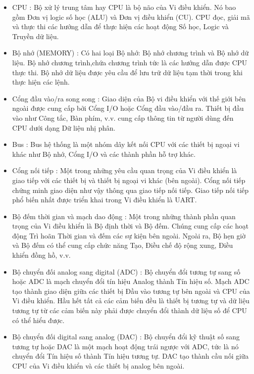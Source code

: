\documentclass{article} %
\begin{document}
	\begin{itemize}
		\item CPU : Bộ xử lý trung tâm hay CPU là bộ não của Vi điều khiển. Nó bao gồm Đơn vị logic số học (ALU) và Đơn vị điều khiển (CU). CPU đọc, giải mã và thực thi các hướng dẫn để thực hiện các hoạt động Số học, Logic và Truyền dữ liệu.
		\item Bộ nhớ (MEMORY) : Có hai loại Bộ nhớ: Bộ nhớ chương trình và Bộ nhớ dữ liệu. Bộ nhớ chương trình,chứa chương trình tức là các hướng dẫn được CPU thực thi.  Bộ nhớ dữ liệu được yêu cầu để lưu trữ dữ liệu tạm thời trong khi thực hiện các lệnh.
		\item Cổng đầu vào/ra song song : Giao diện của Bộ vi điều khiển với thế giới bên ngoài được cung cấp bởi Cổng I/O hoặc Cổng đầu vào/đầu ra. Thiết bị đầu vào như Công tắc, Bàn phím, v.v. cung cấp thông tin từ người dùng đến CPU dưới dạng Dữ liệu nhị phân.
		\item Bus : Bus hệ thống là một nhóm dây kết nối CPU với các thiết bị ngoại vi khác như Bộ nhớ, Cổng I/O và các thành phần hỗ trợ khác.
		\item Cổng nối tiếp : Một trong những yêu cầu quan trọng của Vi điều khiển là giao tiếp với các thiết bị và thiết bị ngoại vi khác (bên ngoài). Cổng nối tiếp chứng minh giao diện như vậy thông qua giao tiếp nối tiếp. Giao tiếp nối tiếp phổ biến nhất được triển khai trong Vi điều khiển là UART.
		\item Bộ đếm thời gian và mạch dao động : Một trong những thành phần quan trọng của Vi điều khiển là Bộ định thời và Bộ đếm. Chúng cung cấp các hoạt động Trì hoãn Thời gian và đếm các sự kiện bên ngoài. Ngoài ra, Bộ hẹn giờ và Bộ đếm có thể cung cấp chức năng Tạo, Điều chế độ rộng xung, Điều khiển đồng hồ, v.v.
		\item Bộ chuyển đối analog sang digital (ADC) : Bộ chuyển đổi tương tự sang số hoặc ADC là mạch chuyển đổi tín hiệu Analog thành Tín hiệu số. Mạch ADC tạo thành giao diện giữa các thiết bị Đầu vào tương tự bên ngoài và CPU của Vi điều khiển. Hầu hết tất cả các cảm biến đều là thiết bị tương tự và dữ liệu tương tự từ các cảm biến này phải được chuyển đổi thành dữ liệu số để CPU có thể hiểu được.
		\item Bộ chuyển đối digital sang analog (DAC) : Bộ chuyển đổi kỹ thuật số sang tương tự hoặc DAC là một mạch hoạt động trái ngược với ADC, tức là nó chuyển đổi Tín hiệu số thành Tín hiệu tương tự. DAC tạo thành cầu nối giữa CPU của Vi điều khiển và các thiết bị analog bên ngoài.
		
	\end{itemize}
	
\end{document}
